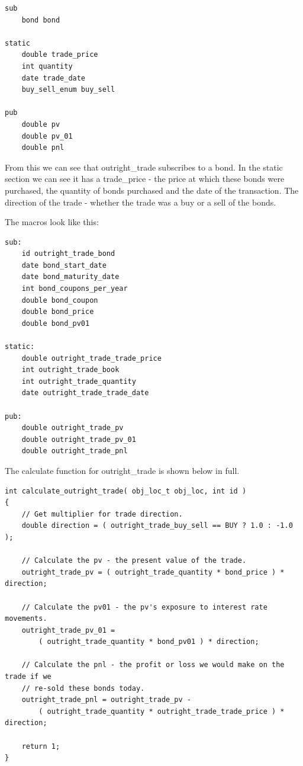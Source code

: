 \documentclass{report}
\begin{document}
\begin{verbatim}
sub
    bond bond

static
    double trade_price
    int quantity
    date trade_date
    buy_sell_enum buy_sell

pub
    double pv
    double pv_01
    double pnl
\end{verbatim}

From this we can see that outright_trade subscribes to a bond. In the static section we can see it has a trade_price - the price at which these bonds were purchased, the quantity of bonds purchased and the date of the transaction. The direction of the trade - whether the trade was a buy or a sell of the bonds.

The macros look like this:

\begin{verbatim}
sub:
    id outright_trade_bond
    date bond_start_date
    date bond_maturity_date
    int bond_coupons_per_year
    double bond_coupon
    double bond_price
    double bond_pv01

static:
    double outright_trade_trade_price
    int outright_trade_book
    int outright_trade_quantity
    date outright_trade_trade_date

pub:
    double outright_trade_pv
    double outright_trade_pv_01
    double outright_trade_pnl
\end{verbatim}

The calculate function for outright_trade is shown below in full.

\begin{verbatim}
int calculate_outright_trade( obj_loc_t obj_loc, int id )
{
    // Get multiplier for trade direction.
    double direction = ( outright_trade_buy_sell == BUY ? 1.0 : -1.0 );

    // Calculate the pv - the present value of the trade.
    outright_trade_pv = ( outright_trade_quantity * bond_price ) * direction;

    // Calculate the pv01 - the pv's exposure to interest rate movements.
    outright_trade_pv_01 = 
        ( outright_trade_quantity * bond_pv01 ) * direction;

    // Calculate the pnl - the profit or loss we would make on the trade if we 
    // re-sold these bonds today.
    outright_trade_pnl = outright_trade_pv - 
        ( outright_trade_quantity * outright_trade_trade_price ) * direction;

    return 1;
}
\end{verbatim}
\end{document}
